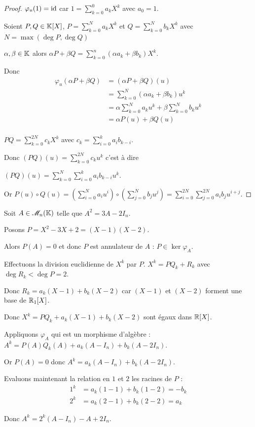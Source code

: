 \begin{proof}
    $\varphi_u(1) = \operatorname{id}$ car $\displaystyle 1 = \sum_{k = 0 }^{ 0 } a_k X^k$ avec $a_0 = 1$.

    Soient $P, Q \in \mathbb{K}[X]$, $\displaystyle P = \sum_{k = 0 }^{ N } a_k X^k$ et $\displaystyle Q = \sum_{k = 0 }^{ N} b_k X^k$
    avec $N = \max(\deg P, \deg Q)$ 

    $\alpha, \beta \in \mathbb{K}$ alors $\displaystyle\alpha P + \beta Q = \sum_{k = 0 }^{n } (\alpha a_k + \beta b_k) X^k$.

    Donc 
    \begin{align}
        \varphi_u(\alpha P + \beta Q) & = (\alpha P + \beta Q)(u) \\
        & = \sum_{k = 0 }^{ N } (\alpha a_k + \beta b_k) u^k \\
        & = \alpha \sum_{k = 0 }^{ N } a_k u^k + \beta \sum_{k = 0 }^{ N } b_k u^k \\
        & = \alpha P(u) + \beta Q(u) \\
    \end{align}

    $\displaystyle PQ = \sum_{k = 0 }^{ 2N } c_k X^k$ avec $\displaystyle c_k = \sum_{i = 0 }^{ k } a_i b_{k - i}$.

    Donc $\displaystyle (PQ)(u) = \sum_{k = 0 }^{ 2N } c_k u^k$ c'est à dire 

    $\displaystyle (PQ)(u) = \sum_{k = 0 }^{ N} \sum_{i = 0 }^{k } a_i b_{k - i} u^k$.

    Or $\displaystyle P(u) \circ Q(u) = (\sum_{i = 0 }^{ N } a_i u^i)\circ( \sum_{j = 0 }^{ N } b_j u^j)
    = \sum_{i = 0 }^{ 2N} \sum_{j = 0 }^{2N } a_i b_j u^{i + j}$.
\end{proof}



\begin{exemple}
    Soit $A \in \mathscr M_n(\mathbb{K})$ telle que $A^2 = 3A - 2 I_n$. 

    Posons $P = X^2 - 3X + 2 = (X - 1)(X - 2)$.

    Alors $P(A) = 0$ et donc $P$ est annulateur de $A$ : $P \in \ker \varphi_A$.

    Effectuons la division euclidienne de $X^k$ par $P$. $X^k = PQ_k + R_k$ avec 
    $\deg R_k < \deg P = 2$.

    Donc $R_k = a_k(X - 1) + b_k (X - 2)$ car $(X - 1)$ et $(X - 2)$ forment une base de $\mathbb{R}_1[X]$.

    Donc $X^k = P Q_k + a_k (X - 1) + b_k (X - 2)$ sont égaux dans $\mathbb{R}[X]$. 

    Appliquons $\varphi_A$ qui est un morphisme d'algèbre : $A^k = P(A) Q_k(A) + a_k (A - I_n) + b_k (A - 2 I_n)$.

    Or $P(A) = 0$ donc $A^k = a_k (A - I_n) + b_k (A - 2 I_n)$.

    Evaluons maintenant la relation en $1$ et $2$ les racines de $P$ : 
    \begin{align}
        1^k & = a_k (1 - 1) + b_k (1 - 2) = -b_k \\
        2^k & = a_k (2 - 1) + b_k (2 - 2) = a_k
    \end{align}

    Donc $A^k = 2^k (A - I_n) - A + 2 I_n$.
\end{exemple}



